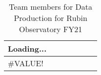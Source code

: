 \tiny \begin{longtable} {|l|p{}|p{}|p{}|l|l|l|} \caption{Team members for Data Production for Rubin Observatory  FY21 \label{tab:teams}}\\ 
\hline 
\textbf{Loading...}&&&&& \\ \hline
{\#VALUE!}&&&&& \\ \hline
\end{longtable} \normalsize
